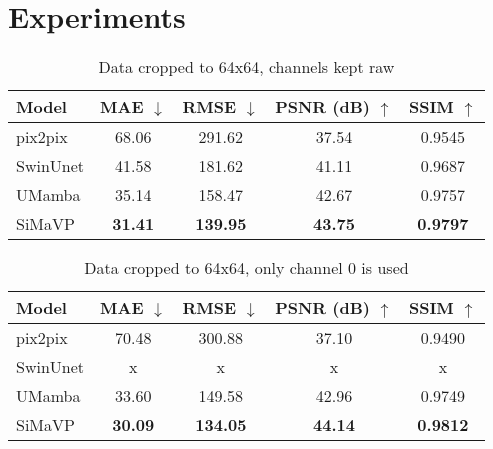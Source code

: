 \chapter{Experiments}

\begin{table}[]
\centering
\caption{Data cropped to 64x64, channels kept raw}
\label{tab:experiment_results}
\begin{tabular}{lcccc}
\hline
\textbf{Model} & \textbf{MAE} $\downarrow$ & \textbf{RMSE} $\downarrow$ & \textbf{PSNR (dB)} $\uparrow$ & \textbf{SSIM} $\uparrow$ \\
\hline
pix2pix  & 68.06 & 291.62 & 37.54 & 0.9545 \\
SwinUnet & 41.58 & 181.62 & 41.11 & 0.9687 \\
UMamba   & 35.14 & 158.47 & 42.67 & 0.9757 \\
SiMaVP   & \textbf{31.41} & \textbf{139.95} & \textbf{43.75} & \textbf{0.9797} \\
\hline
\end{tabular}
\end{table}

\begin{table}[]
    \centering
    \caption{Data cropped to 64x64, only channel 0 is used}
    \label{tab:experiment_results}
    \begin{tabular}{lcccc}
    \hline
    \textbf{Model} & \textbf{MAE} $\downarrow$ & \textbf{RMSE} $\downarrow$ & \textbf{PSNR (dB)} $\uparrow$ & \textbf{SSIM} $\uparrow$ \\
    \hline
    pix2pix  & 70.48 & 300.88 & 37.10 & 0.9490 \\
    SwinUnet & x & x & x & x \\
    UMamba   & 33.60 & 149.58 & 42.96 & 0.9749 \\
    SiMaVP   & \textbf{30.09} & \textbf{134.05} & \textbf{44.14} & \textbf{0.9812} \\
    \hline
    \end{tabular}
\end{table}

